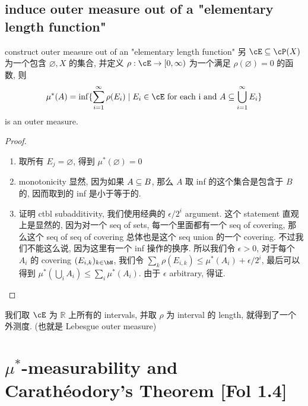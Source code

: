 \documentclass[lang=cn,11pt]{elegantbook}
\begin{document}
\section{induce outer measure out of a "elementary length function"}
\begin{theorem}{construct outer measure out of an "elementary  length function" }\label{construct outer measure out of a "elementary length function"}
    另 $\cE \sub \cP(X)$ 为一个包含 $\varnothing, X$ 的集合, 并定义 $\rho: \cE \rar [0,\infty)$ 为一个满足 $\rho(\varnothing) = 0$ 的函数, 则
\[
\mu^*(A )  = \inf \{    \sum_{i=1}^\infty \rho(E_i) \mid E_i \in \cE \text{ for each i and }  A \sub \bigcup_{i=1}^\infty E_i    \}
\]
is an outer measure.
\end{theorem}
\begin{proof}
\begin{enumerate}
    \item 取所有 $E_j = \varnothing$, 得到 $\mu^*(\varnothing) = 0$
    \item monotonicity 显然, 因为如果 $A \subseteq B$, 那么 $A$ 取 inf 的这个集合是包含于 $B$ 的, 因而取到的 inf 是小于等于的.
    \item  证明 ctbl subadditivity, 我们使用经典的 $\epsilon  / 2^i$ argument. 这个 statement 直观上是显然的, 因为对一个 seq of sets, 每一个里面都有一个 seq of covering, 那么这个 seq of seq of covering 总体也是这个 seq union 的一个  covering. 不过我们不能这么说, 因为这里有一个 inf 操作的换序. 所以我们令 $\epsilon >0$, 对于每个 $A_i$ 的 covering $(E_{i,k})_{k\in\bN}$, 我们令 $\sum_k \rho(E_{i,k}) \leq \mu^*(A_i) + \epsilon / 2^i$,  最后可以得到 $\mu^*(\bigcup_i A_i) \leq \sum_i \mu^*(A_i)$. 由于 $\epsilon$ arbitrary, 得证.
\end{enumerate}
\end{proof}
\begin{example}
    我们取 $\cE$ 为 $\mathbb{R}$ 上所有的 intervals, 并取 $\rho $ 为 interval 的 length, 就得到了一个外测度. (也就是 Lebesgue outer measure)
\end{example}





\chapter{$\mu^*$-measurability and Carathéodory's Theorem [Fol 1.4]}
\end{document}
